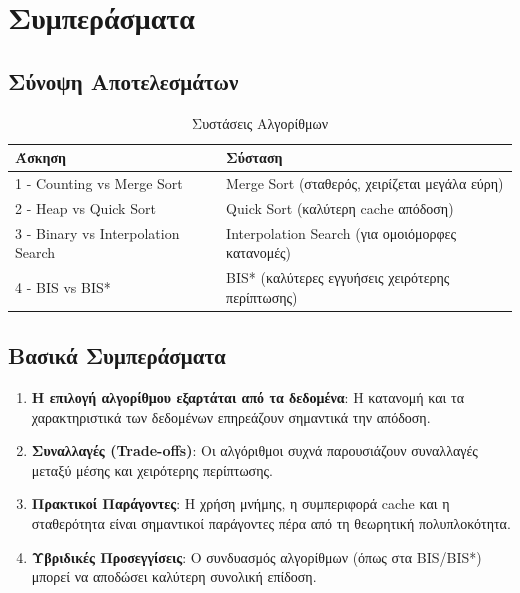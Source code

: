 \documentclass[a4paper,12pt]{article}
\begin{document}
	\newpage
	\section{Συμπεράσματα}
	
	\subsection{Σύνοψη Αποτελεσμάτων}
	
	\begin{table}[H]
		\centering
		\begin{tabular}{|l|l|}
			\hline
			\textbf{Άσκηση} & \textbf{Σύσταση} \\
			\hline
			1 - Counting vs Merge Sort & Merge Sort (σταθερός, χειρίζεται μεγάλα εύρη) \\
			2 - Heap vs Quick Sort & Quick Sort (καλύτερη cache απόδοση) \\
			3 - Binary vs Interpolation Search & Interpolation Search (για ομοιόμορφες κατανομές) \\
			4 - BIS vs BIS* & BIS* (καλύτερες εγγυήσεις χειρότερης περίπτωσης) \\
			\hline
		\end{tabular}
		\caption{Συστάσεις Αλγορίθμων}
	\end{table}
	
	\subsection{Βασικά Συμπεράσματα}
	
	\begin{enumerate}
		\item \textbf{Η επιλογή αλγορίθμου εξαρτάται από τα δεδομένα}: Η κατανομή και τα χαρακτηριστικά των δεδομένων επηρεάζουν σημαντικά την απόδοση.
		
		\item \textbf{Συναλλαγές (Trade-offs)}: Οι αλγόριθμοι συχνά παρουσιάζουν συναλλαγές μεταξύ μέσης και χειρότερης περίπτωσης.
		
		\item \textbf{Πρακτικοί Παράγοντες}: Η χρήση μνήμης, η συμπεριφορά cache και η σταθερότητα είναι σημαντικοί παράγοντες πέρα από τη θεωρητική πολυπλοκότητα.
		
		\item \textbf{Υβριδικές Προσεγγίσεις}: Ο συνδυασμός αλγορίθμων (όπως στα BIS/BIS*) μπορεί να αποδώσει καλύτερη συνολική επίδοση.
	\end{enumerate}
	
\end{document}
